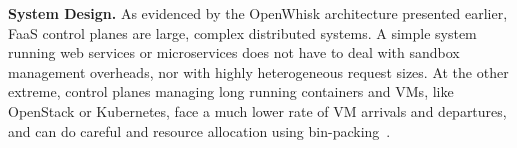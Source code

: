 



\textbf{System Design.}
%
As evidenced by the OpenWhisk architecture presented earlier, FaaS control planes are large, complex distributed systems.
%
A simple system running web services or microservices does not have to deal with sandbox management overheads, nor with highly heterogeneous request sizes.
At the other extreme, control planes managing long running containers and VMs, like OpenStack or Kubernetes, face a much lower rate of VM arrivals and departures, and can do careful and  resource allocation using bin-packing~\cite{cortez2017resource}.


